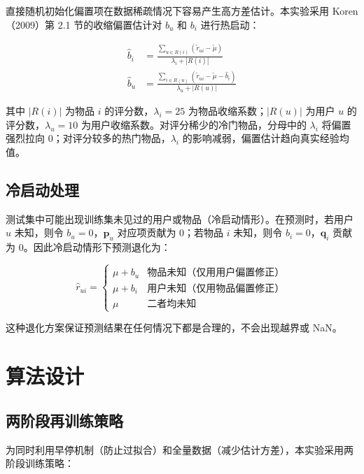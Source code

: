 \documentclass[UTF8,a4paper,10pt]{ctexart}
\newcommand{\xiaosi}{\fontsize{12pt}{20pt}\selectfont}
\begin{document}
直接随机初始化偏置项在数据稀疏情况下容易产生高方差估计。本实验采用 Koren（2009）第 2.1 节的收缩偏置估计对 $b_u$ 和 $b_i$ 进行热启动：

\begin{align}
  \hat{b}_i &= \frac{\displaystyle\sum_{u\in R(i)} (\tilde{r}_{ui} - \tilde{\mu})}{\lambda_i + |R(i)|} \label{eq:shrink-bi}\\[6pt]
  \hat{b}_u &= \frac{\displaystyle\sum_{i\in R(u)} (\tilde{r}_{ui} - \tilde{\mu} - \hat{b}_i)}{\lambda_u + |R(u)|} \label{eq:shrink-bu}
\end{align}

其中 $|R(i)|$ 为物品 $i$ 的评分数，$\lambda_i = 25$ 为物品收缩系数；$|R(u)|$ 为用户 $u$ 的评分数，$\lambda_u = 10$ 为用户收缩系数。对评分稀少的冷门物品，分母中的 $\lambda_i$ 将偏置强烈拉向 0；对评分较多的热门物品，$\lambda_i$ 的影响减弱，偏置估计趋向真实经验均值。

\subsection{冷启动处理}

测试集中可能出现训练集未见过的用户或物品（冷启动情形）。在预测时，若用户 $u$ 未知，则令 $b_u = 0$，$\mathbf{p}_u$ 对应项贡献为 0；若物品 $i$ 未知，则令 $b_i = 0$，$\mathbf{q}_i$ 贡献为 0。因此冷启动情形下预测退化为：

\begin{equation}
  \hat{r}_{ui} =
  \begin{cases}
    \mu + b_u & \text{物品未知（仅用用户偏置修正）} \\
    \mu + b_i & \text{用户未知（仅用物品偏置修正）} \\
    \mu        & \text{二者均未知}
  \end{cases}
\end{equation}

这种退化方案保证预测结果在任何情况下都是合理的，不会出现越界或 NaN。

\section{算法设计}
\xiaosi

\subsection{两阶段再训练策略}

为同时利用早停机制（防止过拟合）和全量数据（减少估计方差），本实验采用两阶段训练策略：
\end{document}
